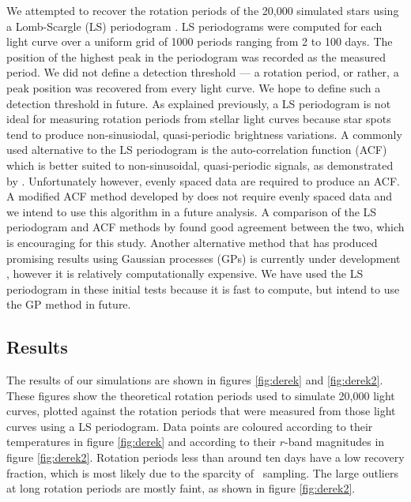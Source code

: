 We attempted to recover the rotation periods of the 20,000 simulated stars
using a Lomb-Scargle (LS) periodogram \citep[][]{Lomb1976, Scargle1982}.
LS periodograms were computed for each light curve over a uniform grid of 1000
periods ranging from 2 to 100 days.
The position of the highest peak in the periodogram was recorded as the
measured period.
We did not define a detection threshold --- a rotation period, or rather, a
peak position was recovered from every light curve.
We hope to define such a detection threshold in future.
As explained previously, a LS periodogram is not ideal for measuring rotation
periods from stellar light curves because star spots tend to produce
non-sinusiodal, quasi-periodic brightness variations.
A commonly used alternative to the LS periodogram is the auto-correlation
function (ACF) which is better suited to non-sinusoidal, quasi-periodic
signals, as demonstrated by \citet{Mcquillan2013}.
Unfortunately however, evenly spaced data are required to produce an ACF.
A modified ACF method developed by \citet{Edelson1988} does not require evenly
spaced data and we intend to use this algorithm in a future analysis.
A comparison of the LS periodogram and ACF methods by \citet{Aigrain2015b}
found good agreement between the two, which is encouraging for this study.
Another alternative method that has produced promising results using Gaussian
processes (GPs) is currently under development \citep{Angus2015b}, however it
is relatively computationally expensive.
We have used the LS periodogram in these initial tests because it is fast to
compute, but intend to use the GP method in future.

\subsection{Results}
\label{sec:LSST_results}

The results of our simulations are shown in figures \ref{fig:derek} and
\ref{fig:derek2}.
These figures show the theoretical rotation periods used to simulate 20,000
light curves, plotted against the rotation periods that were measured from
those light curves using a LS periodogram.
Data points are coloured according to their temperatures in figure
\ref{fig:derek} and according to their $r$-band magnitudes in figure
\ref{fig:derek2}.
Rotation periods less than around ten days have a low recovery fraction, which
is most likely due to the sparcity of \LSST\ sampling.
The large outliers at long rotation periods are mostly faint, as shown in
figure \ref{fig:derek2}.

